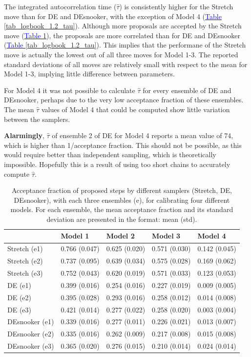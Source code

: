 The integrated autocorrelation time ($\hat{\tau}$) is consistently higher for the Stretch move than for DE and DEsnooker, with the exception of Model 4 (\hyperref[tab_logbook_1.2_tau]{\textcolor{blue}{Table }\ref{tab_logbook_1.2_tau}}). Although more proposals are accepted by the Stretch move (\hyperref[tab_logbook_1.2_acceptance_frac]{\textcolor{blue}{Table }\ref{tab_logbook_1.2_acceptance_frac}}), the proposals are more correlated than for DE and DEsnooker (\hyperref[tab_logbook_1.2_tau]{\textcolor{blue}{Table }\ref{tab_logbook_1.2_tau}}). This implies that the performane of the Stretch move is actually the lowest out of all three moves for Model 1-3. The reported standard deviations of all moves are relatively small with respect to the mean for Model 1-3, implying little difference between parameters. 

For Model 4 it was not possible to calculate $\hat{\tau}$ for every ensemble of DE and DEsnooker, perhaps due to the very low acceptance fraction of these ensembles. The mean $\hat{\tau}$ values of Model 4 that could be computed show little variation between the samplers.    

\textbf{Alarmingly}, $\hat{\tau}$ of ensemble 2 of DE for Model 4 reports a mean value of 74, which is higher than 1/acceptance fraction. This should not be possible, as this would require better than independent sampling, which is theoretically impossible. Hopefully this is a result of using too short chains to accurately compute $\hat{\tau}$. 

\begin{table}[ht]
\caption{Acceptance fraction of proposed steps by different samplers (Stretch, DE, DEsnooker), with each three ensembles (e), for calibrating four different models. For each ensemble, the mean acceptance fraction and its standard deviation are presented in the format: mean (std).}
\label{tab_logbook_1.2_acceptance_frac}
\begin{tabularx}{\textwidth}{XXXXX}
\toprule
 & Model 1 & Model 2 & Model 3 & Model 4 \\
\midrule
Stretch (e1) & 0.766 (0.047) & 0.625 (0.020) & 0.571 (0.030) & 0.142 (0.045) \\
Stretch (e2) & 0.737 (0.095) & 0.639 (0.034) & 0.575 (0.028) & 0.169 (0.062) \\
Stretch (e3) & 0.752 (0.043) & 0.620 (0.019) & 0.571 (0.033) & 0.123 (0.053) \\
\midrule
DE (e1) & 0.399 (0.016) & 0.254 (0.016) & 0.227 (0.019) & 0.009 (0.005) \\
DE (e2) & 0.395 (0.028) & 0.293 (0.016) & 0.258 (0.012) & 0.014 (0.008) \\
DE (e3) & 0.421 (0.014) & 0.277 (0.022) & 0.258 (0.020) & 0.003 (0.004) \\
\midrule
DEsnooker (e1) & 0.339 (0.016) & 0.277 (0.011) & 0.226 (0.021) & 0.013 (0.007) \\
DEsnooker (e2) & 0.335 (0.016) & 0.262 (0.009) & 0.217 (0.008) & 0.015 (0.008) \\
DEsnooker (e3) & 0.365 (0.020) & 0.276 (0.015) & 0.210 (0.014) & 0.024 (0.014) \\
\bottomrule
\end{tabularx}
\end{table}

